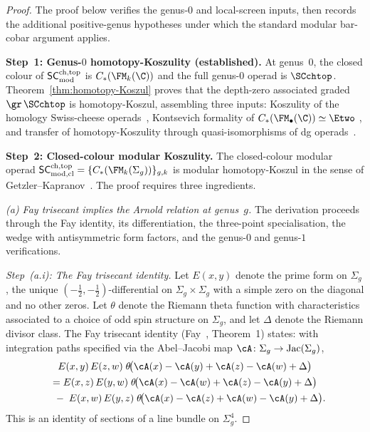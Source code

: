 \begin{proof}
The proof below verifies the genus-$0$ and local-screen inputs,
then records the additional positive-genus hypotheses under which
the standard modular bar-cobar argument applies.

\medskip\noindent
\textbf{Step~1: Genus-$0$ homotopy-Koszulity (established).}
At genus~$0$, the closed colour of $\mathsf{SC}^{\mathrm{ch,top}}_{\mathrm{mod}}$ is
$C_\ast(\FM_k(\C))$ and the full genus-$0$ operad is $\SCchtop$.
Theorem~\ref{thm:homotopy-Koszul} proves that the depth-zero
associated graded $\gr\,\SCchtop$ is
homotopy-Koszul, assembling three inputs: Koszulity of the
homology Swiss-cheese operads~\cite{Hoe09,HL12},
Kontsevich formality of $C_\ast(\FM_\bullet(\C)) \simeq \Etwo$
\cite{Kon03}, and transfer of homotopy-Koszulity through
quasi-isomorphisms of dg operads~\cite{BM03,Val07}.

\medskip\noindent
\textbf{Step~2: Closed-colour modular Koszulity.}
The closed-colour modular operad
$\SCmodcl = \{C_\ast(\FM_k(\Sigma_g))\}_{g,k}$
is modular homotopy-Koszul in the sense of
Getzler--Kapranov~\cite{GK98}. The proof requires three
ingredients.

\medskip
\emph{(a) Fay trisecant implies the Arnold relation at genus~$g$.}
The derivation proceeds through the Fay identity,
its differentiation, the three-point specialisation, the wedge
with antisymmetric form factors, and the genus-$0$ and genus-$1$
verifications.

\medskip
\emph{Step~(a.i): The Fay trisecant identity.}
Let $E(x,y)$ denote the prime form on $\Sigma_g$, the
unique $(-\tfrac{1}{2}, -\tfrac{1}{2})$-differential on
$\Sigma_g \times \Sigma_g$ with a simple zero on the diagonal
and no other zeros. Let $\theta$ denote the Riemann theta
function with characteristics associated to a choice of
odd spin structure on $\Sigma_g$, and let $\Delta$ denote
the Riemann divisor class. The Fay trisecant identity
(Fay~\cite{Fay73}, Theorem~1) states: with integration paths
specified via the Abel--Jacobi map
$\cA \colon \Sigma_g \to \operatorname{Jac}(\Sigma_g)$,
\begin{multline}\label{eq:fay-trisecant}
 E(x,y)\, E(z,w)\;
 \theta\!\bigl(\cA(x) - \cA(y)
 + \cA(z) - \cA(w) + \Delta\bigr) \\
 = E(x,z)\, E(y,w)\;
 \theta\!\bigl(\cA(x) - \cA(w)
 + \cA(z) - \cA(y) + \Delta\bigr) \\
 \quad{}-\; E(x,w)\, E(y,z)\;
 \theta\!\bigl(\cA(x) - \cA(z)
 + \cA(w) - \cA(y) + \Delta\bigr).
\end{multline}
This is an identity of sections of a line bundle on
$\Sigma_g^4$.


\end{proof}
